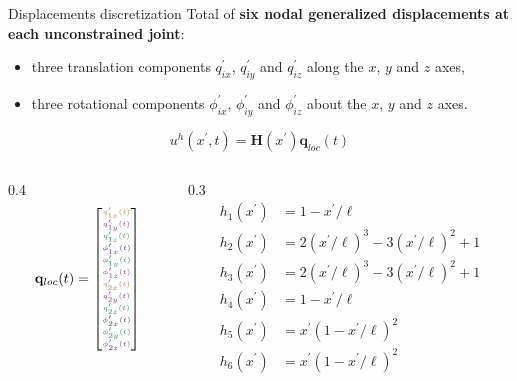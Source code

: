 \documentclass[aspectratio=169]{beamer}
\begin{document}
\begin{frame}{Displacements discretization}
  Total of \textbf{six nodal generalized displacements at each unconstrained joint}:
  \begin{itemize}
    \item three translation components $q_{ix}^\prime$, $q_{iy}^\prime$ and $q_{iz}^\prime$ along the $x$, $y$ and $z$ axes,
    \item three rotational components $\phi_{ix}^\prime$, $\phi_{iy}^\prime$ and $\phi_{iz}^\prime$ about the $x$, $y$ and $z$ axes.
  \end{itemize}\vspace{0.2cm}
  $$u^h(x^\prime,t)=  \mathbf H(x^\prime)\mathbf q_{loc} (t)$$

  \begin{columns}
    \begin{column}{0.4\textwidth}
      $$\tiny \mathbf q_{loc} (t)=\begin{bmatrix}
          {\color{brown} q_{1x}^\prime(t)}             \\[2pt]
          {\color{Purple} q_{1y}^\prime(t)}            \\[2pt]
          {\color{ForestGreen} q_{1z}^\prime(t)}       \\[2pt]
          {\color{BlueViolet} \phi_{1x}^\prime(t)}     \\[2pt]
          {\color{ForestGreen} \phi_{1y}^\prime(t)   } \\[2pt]
          {\color{Purple} \phi_{1z}^\prime(t)}         \\[2pt]
          {\color{brown} q_{2x}^\prime(t)}             \\[2pt]
          {\color{Purple} q_{2y}^\prime(t)}            \\[2pt]
          {\color{ForestGreen} q_{2z}^\prime(t)}       \\[2pt]
          {\color{BlueViolet} \phi_{2x}^\prime(t)}     \\[2pt]
          {\color{ForestGreen} \phi_{2y}^\prime(t)   } \\[2pt]
          {\color{Purple} \phi_{2z}^\prime(t)}         \\[2pt]
        \end{bmatrix}$$
    \end{column}

    \begin{column}{0.3\textwidth}
      \tiny  \begin{align*}
        h_1(x^\prime) & = 1-x^\prime/\ell                        \\
        h_2(x^\prime) & =2(x^\prime/\ell)^3-3(x^\prime/\ell)^2+1 \\
        h_3(x^\prime) & =2(x^\prime/\ell)^3-3(x^\prime/\ell)^2+1 \\
        h_4(x^\prime) & = 1-x^\prime/\ell                        \\
        h_5(x^\prime) & =x^\prime(1-x^\prime/\ell)^2             \\
        h_6(x^\prime) & =x^\prime(1-x^\prime/\ell)^2
      \end{align*}
    \end{column}


\end{columns}
\end{frame}
\end{document}
